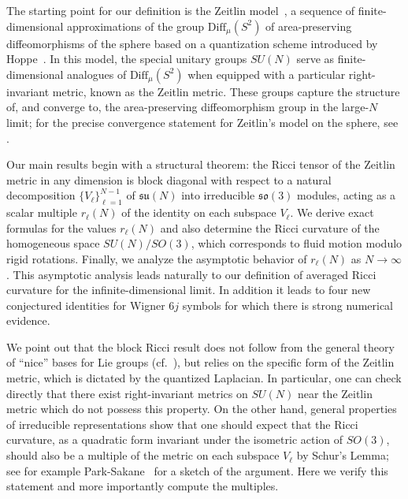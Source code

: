 \documentclass[11pt]{amsart}
\numberwithin{equation}{section}
\theoremstyle{definition}
\begin{document}
The starting point for our definition is the Zeitlin model~\cite{Ze1991}, a sequence of finite-dimensional approximations of the group  $\mathrm{Diff}_{\mu}(S^2)$ of area-preserving diffeomorphisms of the sphere based on a quantization scheme introduced by Hoppe~\cite{Ho1989}. In this model, the special unitary groups $SU(N)$ serve as finite-dimensional analogues of $\mathrm{Diff}_{\mu}(S^2)$ when equipped with a particular right-invariant metric, known as the Zeitlin metric. These groups capture the structure of, and converge to, the area-preserving diffeomorphism group in the large-$N$ limit; for the precise convergence statement for Zeitlin's model on the sphere, see \cite{MoVi2024}. 



Our main results begin with a structural theorem: the Ricci tensor of the Zeitlin metric in any dimension is block diagonal with respect to a natural decomposition $\{V_{\ell}\}_{\ell=1}^{N-1}$ of $\mathfrak{su}(N)$ into irreducible $\mathfrak{so}(3)$ modules, acting as a scalar multiple $r_\ell(N)$ of the identity on each subspace $V_\ell$. We derive exact formulas for the values $r_{\ell}(N)$ 
and also determine the Ricci curvature of the homogeneous space $SU(N)/SO(3)$, which corresponds to fluid motion modulo rigid rotations. Finally, we analyze the asymptotic behavior of $r_{\ell}(N)$ as $N \to \infty$. This asymptotic analysis leads naturally to our definition of averaged Ricci curvature for the infinite-dimensional limit. 
In addition it leads to four new conjectured identities for Wigner $6j$ symbols for which there is strong numerical evidence.


We point out that the block Ricci result does not follow from the general theory of ``nice'' bases for Lie groups (cf.~\cite{krishnan2021diagonal}), but relies on the specific form of the Zeitlin metric, which is dictated by the quantized Laplacian. In particular, one can check directly that there exist right-invariant metrics on $SU(N)$ near the Zeitlin metric which do not possess this property. On the other hand, general properties of irreducible representations show that one should expect that the Ricci curvature, as a quadratic form invariant under the isometric action of $SO(3)$, should also be a multiple of the metric on each subspace $V_{\ell}$ by Schur's Lemma; see for example Park-Sakane~\cite{park1997invariant} for a sketch of the argument. Here we verify this statement and more importantly compute the multiples.
\end{document}
